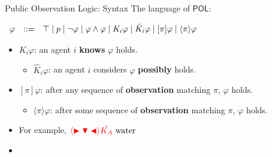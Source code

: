 \documentclass[usenames,dvipsnames]{beamer}
\newcommand\ldiaarg[1]{\langle#1\rangle}
\newcommand{\POL}{\mathsf{POL}}
\newcommand{\ep}{\ensuremath{\varepsilon}}
\newcommand{\obsright}{\blacktriangleright}
\newcommand{\obsleft}{\blacktriangleleft}
\newcommand{\obsdown}{\blacktriangledown}
\renewcommand{\phi}{\varphi}
\begin{document}
\begin{frame}{Public Observation Logic: Syntax\footnotemark[1]}
The language of $\POL$:
\vspace{.1cm}
			
		     $\begin{array}{r@{\quad::= \quad}l}
				\phi  &
				\top
				\mid
				p
				\mid \neg \phi
				\mid \phi \land \phi
				\mid K_i\phi
				\mid \hat{K}_i \phi
				\mid [\pi] \phi
				\mid \ldiaarg{\pi} \phi
			\end{array}$
			
			\vspace{.1cm}
    \begin{itemize}
        \item $K_i\varphi$: an agent $i$ \textbf{knows} $\varphi$ holds.
        \vspace{.1cm}
        \begin{itemize}
            \item $\hat{K}_i\phi$: an agent $i$ considers $\varphi$ \textbf{possibly} holds.
        \end{itemize}
        \vspace{.1cm}
        \item $[\pi]\varphi$: after any sequence of \textbf{observation} matching $\pi$, $\varphi$ holds.
        \vspace{.1cm}
        \begin{itemize}
            \item $\ldiaarg{\pi}\phi$: after some sequence of \textbf{observation} matching $\pi$, $\varphi$ holds.
        \end{itemize}
        \vspace{.1cm}
        \item For example, $\textcolor{red}{\ldiaarg{\obsright\obsdown\obsleft}\hat{K_A}} \textrm{ water }$
    
    \item[]
    

\end{itemize}
\end{frame}
\end{document}
